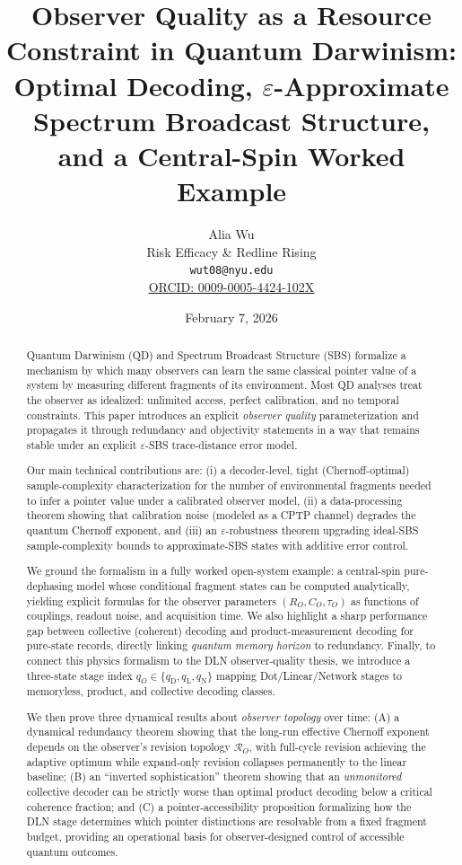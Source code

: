 \documentclass[11pt]{article}
\title{\bf Observer Quality as a Resource Constraint in Quantum Darwinism:\\
Optimal Decoding, $\varepsilon$-Approximate Spectrum Broadcast Structure,\\
and a Central-Spin Worked Example}
\author{
Alia Wu\\
Risk Efficacy \& Redline Rising\\
\texttt{wut08@nyu.edu}\\
\href{https://orcid.org/0009-0005-4424-102X}{ORCID: 0009-0005-4424-102X}
}
\date{February 7, 2026}
\newcommand{\cR}{\mathcal{R}}
\newcommand{\1}{\mathbf{1}}
\theoremstyle{definition}
\theoremstyle{plain}
\begin{document}
\maketitle

\begin{abstract}
Quantum Darwinism (QD) and Spectrum Broadcast Structure (SBS) formalize a mechanism by which many observers can learn the same classical pointer value of a system by measuring different fragments of its environment.
Most QD analyses treat the observer as idealized: unlimited access, perfect calibration, and no temporal constraints.
This paper introduces an explicit \emph{observer quality} parameterization and propagates it through redundancy and objectivity statements in a way that remains stable under an explicit $\varepsilon$-SBS trace-distance error model.

Our main technical contributions are:
(i) a decoder-level, tight (Chernoff-optimal) sample-complexity characterization for the number of environmental fragments needed to infer a pointer value under a calibrated observer model,
(ii) a data-processing theorem showing that calibration noise (modeled as a CPTP channel) degrades the quantum Chernoff exponent, and
(iii) an $\varepsilon$-robustness theorem upgrading ideal-SBS sample-complexity bounds to approximate-SBS states with additive error control.

We ground the formalism in a fully worked open-system example: a central-spin pure-dephasing model whose conditional fragment states can be computed analytically, yielding explicit formulas for the observer parameters $(R_O,C_O,\tau_O)$ as functions of couplings, readout noise, and acquisition time.
We also highlight a sharp performance gap between collective (coherent) decoding and product-measurement decoding for pure-state records, directly linking \emph{quantum memory horizon} to redundancy.
Finally, to connect this physics formalism to the DLN observer-quality thesis, we introduce a three-state stage index $q_O\in\{q_{\mathrm{D}},q_{\mathrm{L}},q_{\mathrm{N}}\}$ mapping Dot/Linear/Network stages to memoryless, product, and collective decoding classes.

We then prove three dynamical results about \emph{observer topology} over time: (A) a dynamical redundancy theorem showing that the long-run effective Chernoff exponent depends on the observer's revision topology $\cR_O$, with full-cycle revision achieving the adaptive optimum while expand-only revision collapses permanently to the linear baseline; (B) an ``inverted sophistication'' theorem showing that an \emph{unmonitored} collective decoder can be strictly worse than optimal product decoding below a critical coherence fraction; and (C) a pointer-accessibility proposition formalizing how the DLN stage determines which pointer distinctions are resolvable from a fixed fragment budget, providing an operational basis for observer-designed control of accessible quantum outcomes.
\end{abstract}
\end{document}
